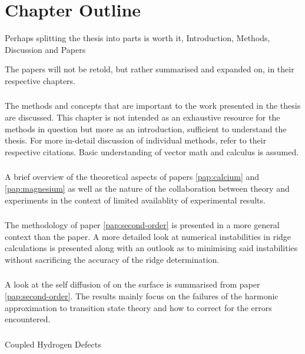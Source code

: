 \section{Chapter Outline}
\label{sec:chapters}

Perhaps splitting the thesis into parts is worth it, Introduction, Methods, Discussion and Papers

The papers will not be retold, but rather summarised and expanded on, in their respective chapters.

\subsubsection{}
The methods and concepts that are important to the work presented in the thesis are discussed.
This chapter is not intended as an exhaustive resource for the methods in question but more as an introduction, sufficient to understand the thesis.
For more in-detail discussion of individual methods, refer to their respective citations.
Basic understanding of vector math and calculus is assumed.

\subsubsection{}
A brief overview of the theoretical aspects of papers \ref{pap:calcium} and \ref{pap:magnesium} as well as the nature of the collaboration between theory and experiments in the context of limited availablity of experimental results.

\subsubsection{}
The methodology of paper \ref{pap:second-order} is presented in a more general context than the paper.
A more detailed look at numerical instabilities in ridge calculations is presented along with an outlook as to minimising said instabilities without sacrificing the accuracy of the ridge determination.

\subsubsection{}
A look at the self diffusion of  on the  surface is summarised from paper \ref{pap:second-order}.
The results mainly focus on the failures of the harmonic approximation to transition state theory and how to correct for the errors encountered.

\subsubsection{}
Coupled Hydrogen Defects \expand

